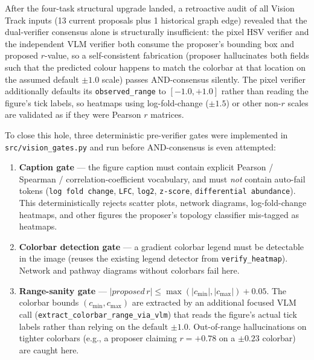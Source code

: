 \documentclass[12pt, letterpaper]{article}
\begin{document}
After the four-task structural upgrade landed, a retroactive audit of all Vision Track inputs (13 current proposals plus 1 historical graph edge) revealed that the dual-verifier consensus alone is structurally insufficient: the pixel HSV verifier and the independent VLM verifier both consume the proposer's bounding box and proposed $r$-value, so a self-consistent fabrication (proposer hallucinates both fields such that the predicted colour happens to match the colorbar at that location on the assumed default $\pm 1.0$ scale) passes AND-consensus silently. The pixel verifier additionally defaults its \texttt{observed\_range} to $[-1.0, +1.0]$ rather than reading the figure's tick labels, so heatmaps using log-fold-change ($\pm 1.5$) or other non-$r$ scales are validated as if they were Pearson $r$ matrices.

To close this hole, three deterministic pre-verifier gates were implemented in \texttt{src/vision\_gates.py} and run before AND-consensus is even attempted:
\begin{enumerate}
    \item \textbf{Caption gate} --- the figure caption must contain explicit Pearson / Spearman / correlation-coefficient vocabulary, and must \emph{not} contain auto-fail tokens (\texttt{log fold change}, \texttt{LFC}, \texttt{log2}, \texttt{z-score}, \texttt{differential abundance}). This deterministically rejects scatter plots, network diagrams, log-fold-change heatmaps, and other figures the proposer's topology classifier mis-tagged as heatmaps.
    \item \textbf{Colorbar detection gate} --- a gradient colorbar legend must be detectable in the image (reuses the existing legend detector from \texttt{verify\_heatmap}). Network and pathway diagrams without colorbars fail here.
    \item \textbf{Range-sanity gate} --- $|proposed\,r| \leq \max(|c_{\min}|, |c_{\max}|) + 0.05$. The colorbar bounds $(c_{\min}, c_{\max})$ are extracted by an additional focused VLM call (\texttt{extract\_colorbar\_range\_via\_vlm}) that reads the figure's actual tick labels rather than relying on the default $\pm 1.0$. Out-of-range hallucinations on tighter colorbars (e.g., a proposer claiming $r = +0.78$ on a $\pm 0.23$ colorbar) are caught here.
\end{enumerate}
\end{document}
